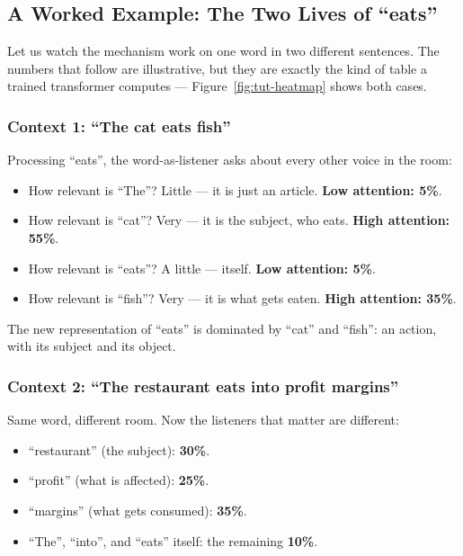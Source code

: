 \subsection{A Worked Example: The Two Lives of ``eats''}
\label{subsec:tut-example}

Let us watch the mechanism work on one word in two different sentences. The numbers that follow are illustrative, but they are exactly the kind of table a trained transformer computes --- Figure~\ref{fig:tut-heatmap} shows both cases.

\subsubsection{Context 1: ``The cat eats fish''}

Processing ``eats'', the word-as-listener asks about every other voice in the room:
\begin{itemize}[leftmargin=*]
    \item How relevant is ``The''? Little --- it is just an article. \textbf{Low attention: 5\%}.
    \item How relevant is ``cat''? Very --- it is the subject, who eats. \textbf{High attention: 55\%}.
    \item How relevant is ``eats''? A little --- itself. \textbf{Low attention: 5\%}.
    \item How relevant is ``fish''? Very --- it is what gets eaten. \textbf{High attention: 35\%}.
\end{itemize}
The new representation of ``eats'' is dominated by ``cat'' and ``fish'': an action, with its subject and its object.

\subsubsection{Context 2: ``The restaurant eats into profit margins''}

Same word, different room. Now the listeners that matter are different:
\begin{itemize}[leftmargin=*]
    \item ``restaurant'' (the subject): \textbf{30\%}.
    \item ``profit'' (what is affected): \textbf{25\%}.
    \item ``margins'' (what gets consumed): \textbf{35\%}.
    \item ``The'', ``into'', and ``eats'' itself: the remaining \textbf{10\%}.
\end{itemize}

